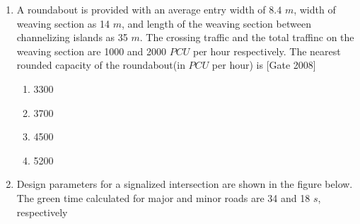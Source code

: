 \documentclass[journal]{IEEEtran}
\begin{document}
\begin{enumerate}
\begin{center}
\begin{tabular}{|l|l|}
\end{tabular}
\end{center}
\begin{multicols}{2}
	\begin{enumerate}
		\item P-4,Q-3,R-1,S-2
		\item P-4,Q-3,R-2,S-1
		\item P-3,Q-4,R-2,S-1
		\item P-1,Q-2,R-3,S-4
	\end{enumerate}
\end{multicols}


	\item A roundabout is provided with an average entry width of $8.4$ $m$, width of weaving section as 14 $m$, and length of the weaving section between channelizing islands as 35 $m$. The crossing traffic and the total traffinc on the weaving section are 1000 and 2000 $PCU$ per hour respectively. The nearest rounded capacity of the roundabout(in $PCU$ per hour) is \hfill [Gate 2008]
\begin{multicols}{2}
	\begin{enumerate}
		\item 3300
		\item 3700
		\item 4500
		\item 5200
	\end{enumerate}
\end{multicols}	
	\item Design parameters for a signalized intersection are shown in the figure below. The green time calculated for major and minor roads are 34 and 18 $s$, respectively 
		\begin{figure}[h]
\centering
{}
\end{figure}
\end{enumerate}
\end{document}
